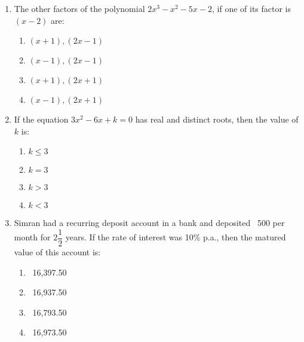 \begin{enumerate}[label=(\roman*)]
    \item The other factors of the polynomial $2x^3 - x^2 -5x -2$, if one
        of its factor is $(x-2)$ are:

        \begin{multicols}{2}
        \begin{enumerate}[label=(\alph*)]
            \item $(x+1),(2x-1)$ 
            \item $(x-1),(2x-1)$ 
            \item $(x+1),(2x+1)$ 
            \item $(x-1),(2x+1)$ 
        \end{enumerate}
        \end{multicols}

    \item If the equation $3x^2 - 6x + k = 0$ has real and distinct roots, then the 
        value of $k$ is:

        \begin{multicols}{2}
        \begin{enumerate}[label=(\alph*)]
            \item $k \leq 3$ 
            \item $k = 3$ 
            \item $k > 3$ 
            \item $k < 3$ 
        \end{enumerate}
        \end{multicols}

    \item Simran had a recurring deposit account in a bank and deposited 
        \rupee~500 per month for $2\dfrac12$ years. If the rate of interest was
        10\% p.a., then the matured value of this account is:

        \begin{multicols}{2}
        \begin{enumerate}[label=(\alph*)]
            \item \rupee~16,397.50 
            \item \rupee~16,937.50 
            \item \rupee~16,793.50 
            \item \rupee~16,973.50 
        \end{enumerate}
        \end{multicols}

\end{enumerate}

